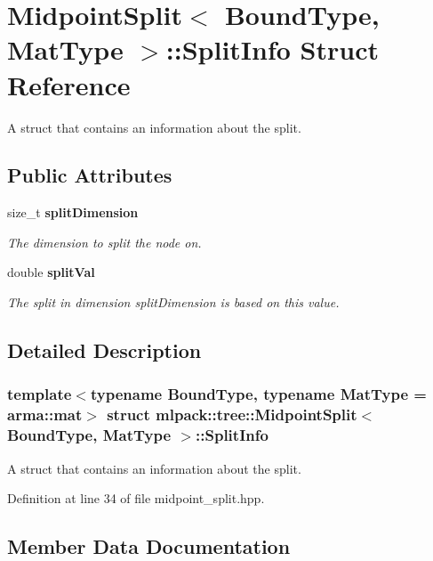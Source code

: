 \section{Midpoint\+Split$<$ Bound\+Type, Mat\+Type $>$\+:\+:Split\+Info Struct Reference}
\label{structmlpack_1_1tree_1_1MidpointSplit_1_1SplitInfo}


A struct that contains an information about the split.  


\subsection*{Public Attributes}
\begin{DoxyCompactItemize}
\item 
size\+\_\+t \textbf{ split\+Dimension}
\begin{DoxyCompactList}\small\item\em The dimension to split the node on. \end{DoxyCompactList}\item 
double \textbf{ split\+Val}
\begin{DoxyCompactList}\small\item\em The split in dimension split\+Dimension is based on this value. \end{DoxyCompactList}\end{DoxyCompactItemize}


\subsection{Detailed Description}
\subsubsection*{template$<$typename Bound\+Type, typename Mat\+Type = arma\+::mat$>$\newline
struct mlpack\+::tree\+::\+Midpoint\+Split$<$ Bound\+Type, Mat\+Type $>$\+::\+Split\+Info}

A struct that contains an information about the split. 

Definition at line 34 of file midpoint\+\_\+split.\+hpp.



\subsection{Member Data Documentation}
\mbox{\label{structmlpack_1_1tree_1_1MidpointSplit_1_1SplitInfo_a351b01278d3022d478536e0a84a1808e}} 
